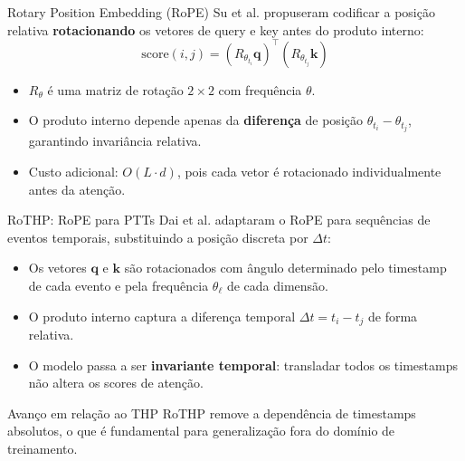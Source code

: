 \documentclass[aspectratio=169]{beamer}
\begin{document}
\begin{frame}{Rotary Position Embedding (RoPE)}
  Su et al. propuseram codificar a posição relativa
  \textbf{rotacionando} os vetores de query e key antes do produto interno:
  \[
    \text{score}(i, j) = (R_{\theta_{t_i}} \mathbf{q})^\top (R_{\theta_{t_j}} \mathbf{k})
  \]
  \begin{itemize}
    \item $R_\theta$ é uma matriz de rotação $2 \times 2$ com frequência $\theta$.
    \item O produto interno depende apenas da \textbf{diferença} de posição
          $\theta_{t_i} - \theta_{t_j}$, garantindo invariância relativa.
    \item Custo adicional: $O(L \cdot d)$, pois cada vetor é rotacionado
          individualmente antes da atenção.
  \end{itemize}
\end{frame}

\begin{frame}{RoTHP: RoPE para PTTs}
  Dai et al. adaptaram o RoPE para sequências de
  eventos temporais, substituindo a posição discreta por $\Delta t$:
  \begin{itemize}
    \item Os vetores $\mathbf{q}$ e $\mathbf{k}$ são rotacionados com
          ângulo determinado pelo timestamp de cada evento e pela
          frequência $\theta_\ell$ de cada dimensão.
    \item O produto interno captura a diferença temporal
          $\Delta t = t_i - t_j$ de forma relativa.
    \item O modelo passa a ser \textbf{invariante temporal}: transladar
          todos os timestamps não altera os scores de atenção.
  \end{itemize}
  \begin{block}{Avanço em relação ao THP}
    RoTHP remove a dependência de timestamps absolutos, o que é fundamental
    para generalização fora do domínio de treinamento.
  \end{block}
\end{frame}
\end{document}
